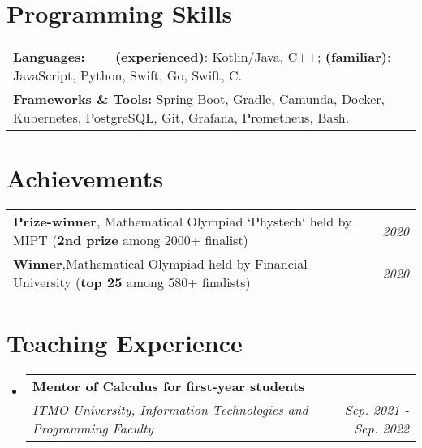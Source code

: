 \documentclass[letterpaper,10pt]{article}
\makeatletter
\newcommand{\resumeSubheading}[4]{
    \vspace{-1pt}\item
        \begin{tabular*}{0.97\textwidth}{l@{\extracolsep{\fill}}r}
            \textbf{#3} & \textcolor{mygray}{#2} \\
            \textit{\small#1} & \textcolor{mygray}{\textit{\small #4}} \\
        \end{tabular*}\vspace{-5pt}
}
\newcommand{\resumeSubHeadingListStart}{\begin{itemize}[leftmargin=*]}
\newcommand{\resumeSubHeadingListEnd}{\end{itemize}}
\makeatother
\begin{document}
\section{Programming Skills}
        \resumeSubHeadingListStart
            \begin{tabular}{ll}
                \textbf{Languages:} \qquad\qquad\,\,\,\,\,\,\,\,\,\, \textbf{(experienced)}: Kotlin/Java, C++; \textbf{(familiar)}: JavaScript, Python,  Swift, Go, Swift, C. \\
                \textbf{Frameworks \& Tools:} \quad Spring Boot, Gradle, Camunda, Docker, Kubernetes, PostgreSQL, Git, Grafana, Prometheus, Bash.
            \end{tabular}
        \resumeSubHeadingListEnd


\vspace{-1pt}

\section{Achievements}
    \resumeSubHeadingListStart
        \begin{tabular}{ll}
            \textbf{Prize-winner}, \quad Mathematical Olympiad `Phystech` held by MIPT (\textbf{2nd prize} among 2000+ finalist) & \quad\quad\quad\quad\quad\quad\quad\quad \textit{\small 2020}\\
            \textbf{Winner},\quad\quad\quad\quad Mathematical Olympiad held by Financial University (\textbf{top 25} among 580+ finalists) & \quad\quad\quad\quad\quad\quad\quad\quad \textit{\small 2020} 
        \end{tabular}
    \resumeSubHeadingListEnd


\vspace{0.005pt}
\vspace{-1pt}

\section{Teaching Experience}
    \resumeSubHeadingListStart
        \resumeSubheading
            {ITMO University, Information Technologies and Programming Faculty}{}
            {Mentor of \textbf{Calculus} for first-year students}{Sep. 2021 - Sep. 2022}
  \resumeSubHeadingListEnd



  
\end{document}
